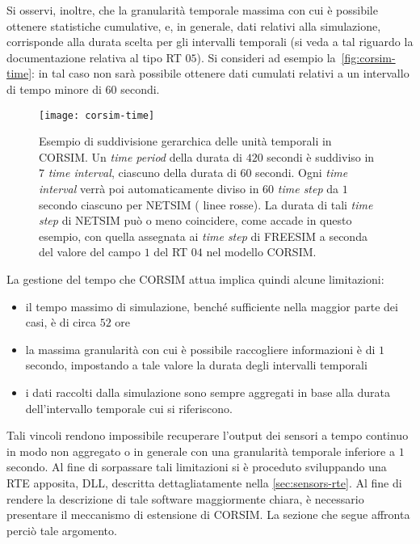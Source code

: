 Si osservi, inoltre, che la granularità temporale massima con cui è possibile ottenere statistiche cumulative, e, in generale, dati relativi alla simulazione, corrisponde alla durata scelta per gli intervalli temporali (si veda a tal riguardo la documentazione relativa al tipo \acs{RT} $05$). Si consideri ad esempio la~\vref{fig:corsim-time}: in tal caso non sarà possibile ottenere dati cumulati relativi a un intervallo di tempo minore di $60$ secondi.
\begin{figure}[htbp]
    \centering
    \texttt{[image: corsim-time]}
    \caption[Gestione del tempo in \acs{CORSIM}]{Esempio di suddivisione gerarchica delle unità temporali in \acs{CORSIM}. Un \emph{time period} della durata di $420$ secondi è suddiviso in $7$ \emph{time interval}, ciascuno della durata di $60$ secondi. Ogni \emph{time interval} verrà poi automaticamente diviso in $60$ \emph{time step} da $1$ secondo ciascuno per \acs{NETSIM} (\ie{} linee rosse). La durata di tali \emph{time step} di \acs{NETSIM} può o meno coincidere, come accade in questo esempio, con quella assegnata ai \emph{time step} di \acs{FREESIM} a seconda del valore del campo $1$ del \acs{RT} $04$ nel modello \acs{CORSIM}.}
    \label{fig:corsim-time}
\end{figure}

La gestione del tempo che \acs{CORSIM} attua implica quindi alcune limitazioni:
\begin{itemize}
    \item il tempo massimo di simulazione, benché sufficiente nella maggior parte dei casi, è di circa $52$ ore
    \item la massima granularità con cui è possibile raccogliere informazioni è di $1$ secondo, impostando a tale valore la durata degli intervalli temporali
    \item i dati raccolti dalla simulazione sono sempre aggregati in base alla durata dell'intervallo temporale cui si riferiscono.
\end{itemize}
Tali vincoli rendono impossibile recuperare l'output dei sensori a tempo continuo in modo non aggregato o in generale con una granularità temporale inferiore a $1$ secondo. Al fine di sorpassare tali limitazioni si è proceduto sviluppando una \acl{RTE} apposita,  \acs{DLL}, descritta dettagliatamente nella \vref{sec:sensors-rte}. Al fine di rendere la descrizione di tale software maggiormente chiara, è necessario presentare il meccanismo di estensione di \acs{CORSIM}. La sezione che segue affronta perciò tale argomento.

